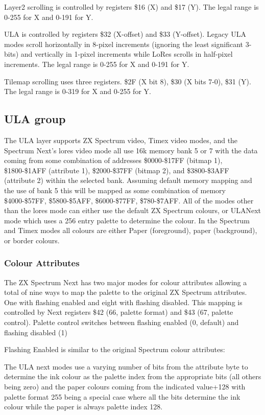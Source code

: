 Layer2 scrolling is controlled by registers \$16 (X) and \$17 (Y). The
legal range is 0-255 for X and 0-191 for Y.

ULA is controlled by registers \$32 (X-offset) and \$33
(Y-offset). Legacy ULA modes scroll horizontally in 8-pixel increments
(ignoring the least significant 3-bits) and vertically in 1-pixel
increments while LoRes scrolls in half-pixel increments. The legal
range is 0-255 for X and 0-191 for Y.

Tilemap scrolling uses three registers. \$2F (X bit 8), \$30 (X bits
7-0), \$31 (Y). The legal range is 0-319 for X and 0-255 for Y.

\subsection{ULA group}

The ULA layer supports ZX Spectrum video, Timex video modes, and the
Spectrum Next’s lores video mode all use 16k memory bank 5 or 7 with
the data coming from some combination of addresses \$0000-\$17FF
(bitmap 1), \$1800-\$1AFF (attribute 1), \$2000-\$37FF (bitmap 2), and
\$3800-\$3AFF (attribute 2) within the selected bank.  Assuming
default memory mapping and the use of bank 5 this will be mapped as
some combination of memory \$4000-\$57FF, \$5800-\$5AFF,
\$6000-\$77FF, \$780-\$7AFF. All of the modes other than the lores
mode can either use the default ZX Spectrum colours, or ULANext mode
which uses a 256 entry palette to determine the colour. In the
Spectrum and Timex modes all colours are either Paper (foreground),
paper (background), or border colours.

\subsubsection{Colour Attributes}

The ZX Spectrum Next has two major modes for colour attributes
allowing a total of nine ways to map the palette to the original ZX
Spectrum attributes. One with flashing enabled and eight with flashing
disabled. This mapping is controlled by Next registers \$42 (66,
palette format) and \$43 (67, palette control).  Palette control
switches between flashing enabled (0, default) and flashing disabled
(1)

Flashing Enabled is similar to the original Spectrum colour attributes:

The ULA next modes use a varying number of bits from the attribute
byte to determine the ink colour as the palette index from the
appropriate bits (all others being zero) and the paper colours coming
from the indicated value+128 with palette format 255 being a special
case where all the bits determine the ink colour while the paper is
always palette index 128.

